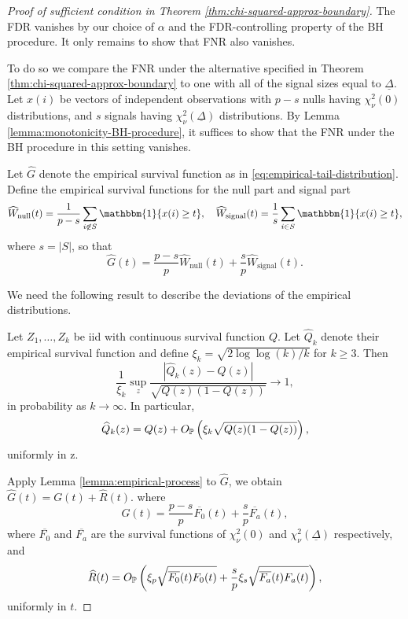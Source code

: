 \begin{proof}[Proof of sufficient condition in Theorem \ref{thm:chi-squared-approx-boundary}]
The FDR vanishes by our choice of $\alpha$ and the FDR-controlling property of the BH procedure.
It only remains to show that FNR also vanishes.

To do so we compare the FNR under the alternative specified in Theorem \ref{thm:chi-squared-approx-boundary} to one with all of the signal sizes equal to $\underline{\Delta}$.
Let $x(i)$ be vectors of independent observations with $p-s$ nulls having $\chi^2_\nu(0)$ distributions, and $s$ signals having $\chi^2_\nu(\underline{\Delta})$ distributions.
By Lemma \ref{lemma:monotonicity-BH-procedure}, it suffices to show that the FNR under the BH procedure in this setting vanishes.

Let $\widehat{G}$ denote the empirical survival function as in \eqref{eq:empirical-tail-distribution}.
Define the empirical survival functions for the null part and signal part
\begin{equation} \label{eq:empirical-survival-null-signal}
    \widehat{W}_\text{null}(t) = \frac{1}{p-s}\sum_{i\not\in S}\mathbbm{1}\{x(i) \ge t\},
    \quad
    \widehat{W}_\text{signal}(t) = \frac{1}{s}\sum_{i\in S}\mathbbm{1}\{x(i) \ge t\},
\end{equation}
where $s=|S|$, so that
$$
\widehat{G}(t) = \frac{p-s}{p}\widehat{W}_\text{null}(t) + \frac{s}{p}\widehat{W}_\text{signal}(t).
$$

We need the following result to describe the deviations of the empirical distributions.
\begin{lemma} \label{lemma:empirical-process}
Let $Z_1,\ldots,Z_k$ be iid with continuous survival function $Q$.
Let $\widehat{Q}_k$ denote their empirical survival function and define 
$\xi_k = \sqrt{2\log{\log{(k)}}/k}$ for $k \ge 3$. 
Then
$$
\frac{1}{\xi_k}\sup_z\frac{|\widehat{Q}_k(z) - Q(z)|}{\sqrt{Q(z)(1 - Q(z))}} \to 1,
$$
in probability as $k \to \infty$.
In particular,
$$
\widehat{Q}_k(z) = Q(z) + O_\P\left(\xi_k\sqrt{Q(z)(1 - Q(z))}\right),
$$
uniformly in z.
\end{lemma}

Apply Lemma \ref{lemma:empirical-process} to $\widehat{G}$, we obtain
$\widehat{G}(t) = G(t) + \widehat{R}(t)$.
where 
\begin{equation} \label{eq:empirical-process-mean}
    G(t) = \frac{p-s}{p}\overline{F_0}(t) + \frac{s}{p}\overline{F_a}(t),
\end{equation}
where $\overline{F_0}$ and $\overline{F_{a}}$ are the survival functions of $\chi_\nu^2(0)$ and $\chi_\nu^2(\underline{\Delta})$ respectively, and 
\begin{equation} \label{eq:empirical-process-residual}
    \widehat{R}(t) = O_\P\left(\xi_p\sqrt{\overline{F_0}(t)F_0(t)} + \frac{s}{p}\xi_s\sqrt{\overline{F_a}(t)F_a(t)}\right),
\end{equation}
uniformly in $t$.


\end{proof}
